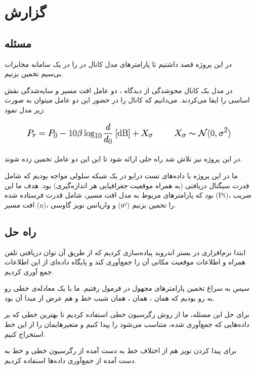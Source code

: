 \chapter{گزارش}

\section{مسئله}
	
در این پروژه قصد داشتیم تا پارامترهای مدل کانال در
 را در یک سامانه مخابرات بی‌سیم تخمین بزنیم. 

در مدل یک کانال محوشدگی از دیدگاه 
، 
دو عامل افت مسیر و سایه‌شدگی نقش اساسی را ایفا می‌کردند. می‌دانیم که کانال را در حضور این دو عامل میتوان به صورت زیر مدل نمود:
\begin{figure}[H]
	\includegraphics[width=0.75\columnwidth]{Picture/formula.png}
	\centering
\end{figure}
در این پروژه نیز تلاش شد راه حلی ارائه شود تا این این دو عامل تخمین زده شوند.

ما در این پروژه با داده‌های تست درایو در یک شبکه سلولی مواجه بودیم که شامل قدرت سیگنال دریافتی (به همراه موقعیت جغرافیایی هر اندازه‌گیری) بود. هدف ما این بود که پارامترهای مربوط به مدل افت مسیر، شامل قدرت فرستاده شده (Pt)، ضریب افت مسیر (n)، و واریانس نویز گاوسی (σ²) را تخمین بزنیم.
	
\section{راه حل}

ابتدا نرم‌افزاری در بستر اندروید پیاده‌سازی کردیم که از طریق آن توان دریافتی تلفن همراه و اطلاعات موقعیت مکانی آن را جمع‌آوری کند و پایگاه داده‌ای از این اطلاعات جمع آوری کردیم.

سپس به سراغ تخمین پارامترهای مجهول در فرمول رفتیم. ما با یک معادله‌ی خطی رو به رو بودیم که 
همان 
،
همان
،
\lr{$\beta$}
همان شیب خط
و 
هم عرض از مبدا آن بود.

برای حل این مسئله، ما از روش رگرسیون خطی استفاده کردیم تا بهترین خطی که بر داده‌هایی که جمع‌آوری شده، متناسب می‌شود را پیدا کنیم و متغیرهایمان را از این خط استخراج کنیم.

برای پیدا کردن 
\lr{$\sigma$}
نویز هم از اختلاف خط به دست آمده از رگرسیون خطی و خط به دست آمده از جمع‌آوری داده‌ها استفاده کردیم.

